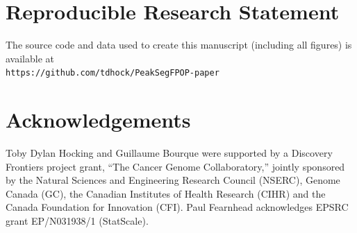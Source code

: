 \documentclass[aoas]{imsart}
\newcommand{\url}[1]{\texttt{#1}}
\begin{document}
\section{Reproducible Research Statement}

The source code and data used to create this manuscript (including all
figures) is available at\\
\url{https://github.com/tdhock/PeakSegFPOP-paper}

\section{Acknowledgements}

Toby Dylan Hocking and Guillaume Bourque were supported by a Discovery
Frontiers project grant, ``The Cancer Genome Collaboratory,'' jointly
sponsored by the Natural Sciences and Engineering Research Council
(NSERC), Genome Canada (GC), the Canadian Institutes of Health
Research (CIHR) and the Canada Foundation for Innovation (CFI). Paul
Fearnhead acknowledges EPSRC grant EP/N031938/1 (StatScale).








\end{document}
